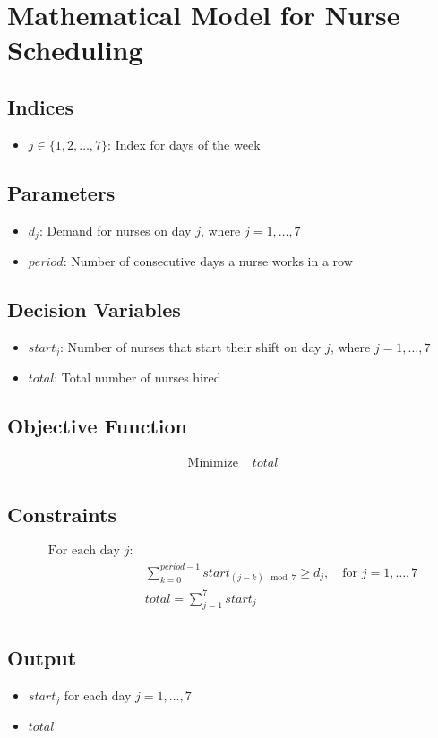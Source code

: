 \documentclass{article}
\begin{document}
\section*{Mathematical Model for Nurse Scheduling}

\subsection*{Indices}
\begin{itemize}
    \item $j \in \{1, 2, \ldots, 7\}$: Index for days of the week
\end{itemize}

\subsection*{Parameters}
\begin{itemize}
    \item $d_j$: Demand for nurses on day $j$, where $j = 1, \ldots, 7$
    \item $period$: Number of consecutive days a nurse works in a row
\end{itemize}

\subsection*{Decision Variables}
\begin{itemize}
    \item $start_j$: Number of nurses that start their shift on day $j$, where $j = 1, \ldots, 7$
    \item $total$: Total number of nurses hired
\end{itemize}

\subsection*{Objective Function}
\begin{align*}
\text{Minimize } & total \\
\end{align*}

\subsection*{Constraints}
\begin{align*}
\text{For each day } j: & \\
& \sum_{k=0}^{period-1} start_{(j-k) \mod 7} \geq d_j, \quad \text{for } j = 1, \ldots, 7 \\
& total = \sum_{j=1}^{7} start_j \\
\end{align*}

\subsection*{Output}
\begin{itemize}
    \item $start_j$ for each day $j = 1, \ldots, 7$
    \item $total$
\end{itemize}
\end{document}
